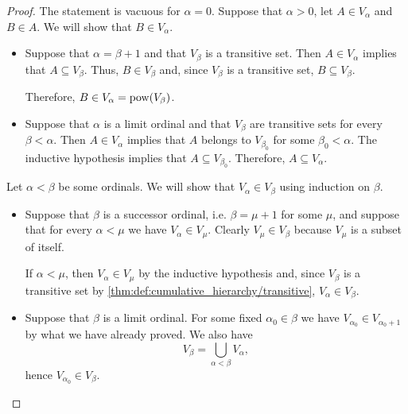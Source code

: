 \begin{proof}
   The statement is vacuous for \( \alpha = 0 \). Suppose that \( \alpha > 0 \), let \( A \in V_\alpha \) and \( B \in A \). We will show that \( B \in V_\alpha \).
  \begin{itemize}
    \item Suppose that \( \alpha = \beta + 1 \) and that \( V_\beta \) is a transitive set. Then \( A \in V_\alpha \) implies that \( A \subseteq V_\beta \). Thus, \( B \in V_\beta \) and, since \( V_\beta \) is a transitive set, \( B \subseteq V_\beta \).

    Therefore, \( B \in V_\alpha = \operatorname{pow}(V_\beta) \).

    \item Suppose that \( \alpha \) is a limit ordinal and that \( V_\beta \) are transitive sets for every \( \beta < \alpha \). Then \( A \in V_\alpha \) implies that \( A \) belongs to \( V_{\beta_0} \) for some \( \beta_0 < \alpha \). The inductive hypothesis implies that \( A \subseteq V_{\beta_0} \). Therefore, \( A \subseteq V_\alpha \).
  \end{itemize}

   Let \( \alpha < \beta \) be some ordinals. We will show that \( V_\alpha \in V_\beta \) using induction on \( \beta \).
  \begin{itemize}
    \item Suppose that \( \beta \) is a successor ordinal, i.e. \( \beta = \mu + 1 \) for some \( \mu \), and suppose that for every \( \alpha < \mu \) we have \( V_\alpha \in V_\mu \). Clearly \( V_\mu \in V_\beta \) because \( V_\mu \) is a subset of itself.

    If \( \alpha < \mu \), then \( V_\alpha \in V_\mu \) by the inductive hypothesis and, since \( V_\beta \) is a transitive set by \cref{thm:def:cumulative_hierarchy/transitive}, \( V_\alpha \in V_\beta \).

    \item Suppose that \( \beta \) is a limit ordinal. For some fixed \( \alpha_0 \in \beta \) we have \( V_{\alpha_0} \in V_{\alpha_0 + 1} \) by what we have already proved. We also have
    \begin{equation*}
      V_\beta
      =
      \bigcup_{\alpha < \beta} V_\alpha,
    \end{equation*}
    hence \( V_{\alpha_0} \in V_\beta \).
  \end{itemize}


\end{proof}
